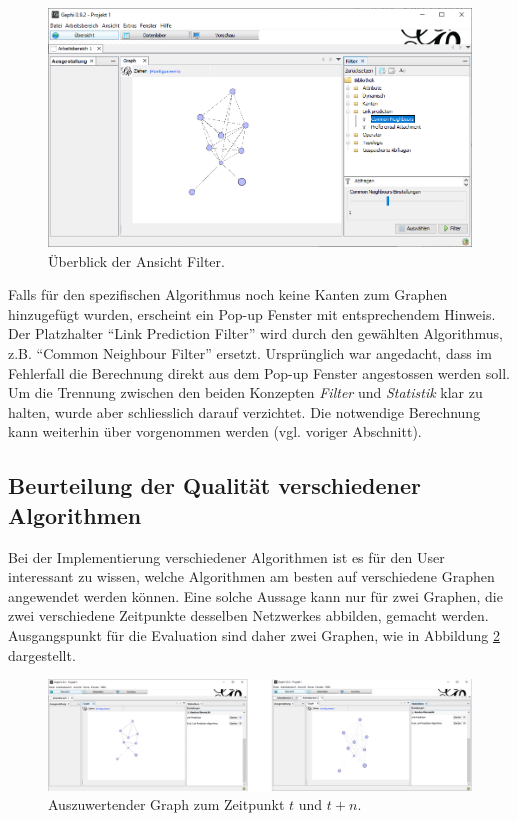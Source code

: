 \begin{figure}
    \includegraphics[width=\linewidth]{resources/sc5.png}
    \caption{Überblick der Ansicht Filter.}
    \label{fig:screen5}
\end{figure}

Falls für den spezifischen Algorithmus noch keine Kanten zum Graphen hinzugefügt wurden, erscheint ein Pop-up Fenster mit entsprechendem Hinweis.
Der Platzhalter ``Link Prediction Filter'' wird durch den gewählten Algorithmus, z.B. ``Common Neighbour Filter'' ersetzt.
Ursprünglich war angedacht, dass im Fehlerfall die Berechnung direkt aus dem Pop-up Fenster angestossen werden soll.
Um die Trennung zwischen den beiden Konzepten \textit{Filter} und \textit{Statistik} klar zu halten, wurde aber schliesslich darauf verzichtet.
Die notwendige Berechnung kann weiterhin über  vorgenommen werden (vgl. voriger Abschnitt).

\subsection{Beurteilung der Qualität verschiedener Algorithmen}

Bei der Implementierung verschiedener Algorithmen ist es für den User interessant zu wissen, welche Algorithmen am
besten auf verschiedene Graphen angewendet werden können. Eine solche Aussage kann nur für zwei Graphen, die zwei
verschiedene Zeitpunkte desselben Netzwerkes abbilden, gemacht werden. Ausgangspunkt für die Evaluation sind daher zwei Graphen, wie in Abbildung \ref{fig:screen8} dargestellt.

\begin{figure}[h]
    \includegraphics[width=\linewidth]{resources/sc6.png}
    \caption{Auszuwertender Graph zum Zeitpunkt $t$ und $t + n$.}
    \label{fig:screen8}
\end{figure}

